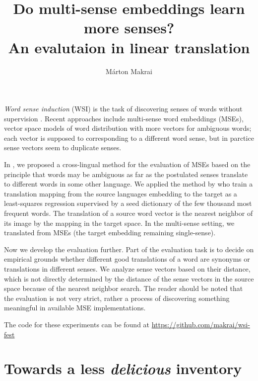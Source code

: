\documentclass[11pt]{article}
\title{Do multi-sense embeddings learn more senses? \\ An evalutaion in linear
translation}
\author{
  Márton Makrai
}
\date{}
\begin{document}
\maketitle



\emph{Word sense induction} (WSI) is the task of discovering senses of words
without supervision \citep{Schutze:1998}. Recent approaches include multi-sense
word embeddings (MSEs), vector space models of word distribution with more
vectors for ambiguous words; each vector is supposed to corresponding to a different
word sense, but in parctice sense vectors seem to duplicate senses.

In \cite{Borbely:2016}, we proposed a cross-lingual method for the evaluation
of MSEs based on the principle that words may be ambiguous as far as the
postulated senses translate to different words in some other language.  We
applied the method by \citet{Mikolov:2013x} who train a translation mapping
from the source languages embedding to the target as a least-squares regression
supervised by a seed dictionary of the  few thousand most frequent words. The
translation of a source word vector is the nearest neighbor of its image by the
mapping in the target space. In the multi-sense setting, we translated from
MSEs (the target embedding remaining single-sense).

Now we develop the evaluation further. Part of the evaluation task is to decide
on empirical grounds whether different good translations of a word are synonyms
or translations in different senses.  We analyze sense vectors based on their
distance, which is not directly determined by the distance of the sense vectors
in the source space because of the nearest neighbor search. The reader should
be noted that the evaluation is not very strict, rather a process of
discovering something meaningful in available MSE implementations.

The code for these experiments can be found at
\url{https://github.com/makrai/wsi-fest}

\section{Towards a less \emph{delicious} inventory}
\end{document}
